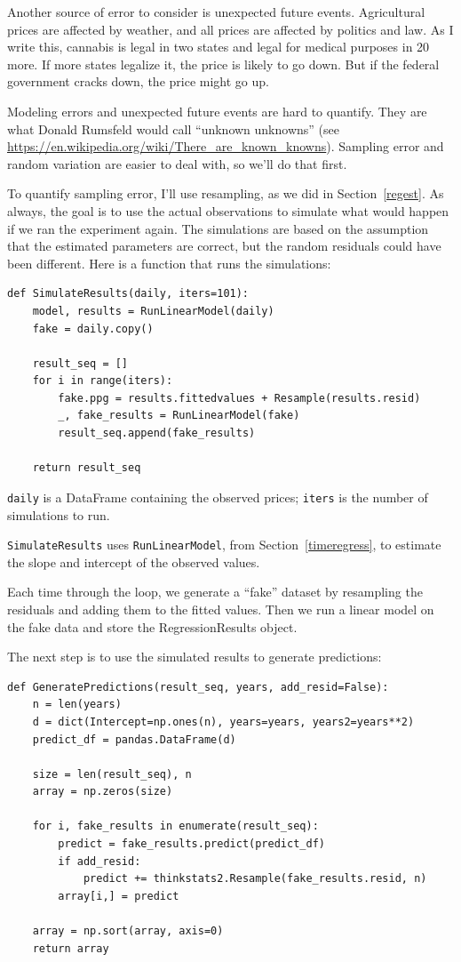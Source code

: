 \documentclass[12pt]{book}
\begin{document}
Another source of error to consider is unexpected future events.
Agricultural prices are affected by weather, and all prices are
affected by politics and law.  As I write this, cannabis is legal in
two states and legal for medical purposes in 20 more.  If more states
legalize it, the price is likely to go down.  But if
the federal government cracks down, the price might go up.

Modeling errors and unexpected future events are hard to
quantify.  They are what Donald Rumsfeld would call ``unknown
unknowns'' (see
\url{https://en.wikipedia.org/wiki/There_are_known_knowns}).  Sampling
error and random variation are easier to deal with, so we'll do
that first.

To quantify sampling error, I'll use resampling, as we did in
Section~\ref{regest}.  As always, the goal is to use the actual
observations to simulate what would happen if we ran the experiment
again.  The simulations are based on the assumption that the estimated
parameters are correct, but the random residuals could have been
different.  Here is a function that runs the simulations:

\begin{verbatim}
def SimulateResults(daily, iters=101):
    model, results = RunLinearModel(daily)
    fake = daily.copy()
    
    result_seq = []
    for i in range(iters):
        fake.ppg = results.fittedvalues + Resample(results.resid)
        _, fake_results = RunLinearModel(fake)
        result_seq.append(fake_results)

    return result_seq
\end{verbatim}

{\tt daily} is a DataFrame containing the observed prices;
{\tt iters} is the number of simulations to run.

{\tt SimulateResults} uses {\tt RunLinearModel}, from
Section~\ref{timeregress}, to estimate the slope and intercept
of the observed values.

Each time through the loop, we generate a ``fake'' dataset by resampling
the residuals and adding them to the fitted values.  Then we run
a linear model on the fake data and store the RegressionResults
object.

The next step is to use the simulated results to generate predictions:

\begin{verbatim}
def GeneratePredictions(result_seq, years, add_resid=False):
    n = len(years)
    d = dict(Intercept=np.ones(n), years=years, years2=years**2)
    predict_df = pandas.DataFrame(d)
    
    size = len(result_seq), n
    array = np.zeros(size)

    for i, fake_results in enumerate(result_seq):
        predict = fake_results.predict(predict_df)
        if add_resid:
            predict += thinkstats2.Resample(fake_results.resid, n)
        array[i,] = predict

    array = np.sort(array, axis=0)
    return array
\end{verbatim}
\end{document}
